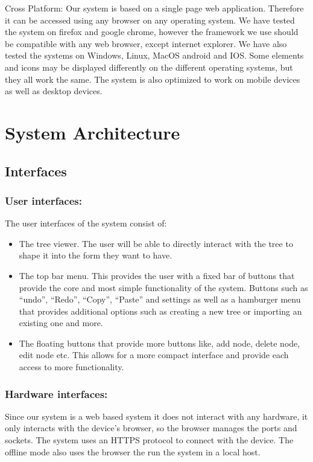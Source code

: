 \documentclass[12pt]{article}
\begin{document}
  Cross Platform:\newline 
  Our system is based on a single page web application. Therefore it can be accessed using any browser on any operating system. We have tested the system on firefox and google chrome, however the framework we use should be compatible with any web browser, except internet explorer. We have also tested the systems on Windows, Linux, MacOS android and IOS. Some elements and icons may be displayed differently on the different operating systems, but they all work the same. The system is also optimized to work on mobile devices as well as desktop devices.\newline\newline  


\section{System Architecture}
  \subsection{Interfaces} 
    \subsubsection{User interfaces:} 
      The user interfaces of the system consist of:
      \begin{itemize}
      \item The tree viewer. The user will be able to directly interact with the tree to shape it into the form they want to have.
      \item The top bar menu. This provides the user with a fixed bar of buttons that provide the core and most simple functionality of the system. Buttons such as “undo”, “Redo”, “Copy”, “Paste” and settings as well as a hamburger menu that provides additional options such as creating a new tree or importing an existing one and more.
      \item The floating buttons that provide more buttons like, add node, delete node, edit node etc. This allows for a more compact interface and provide each access to more functionality.
      \end{itemize}

    \subsubsection{Hardware interfaces:}
      Since our system is a web based system it does not interact with any hardware, it only interacts with the device’s browser, so the browser manages the ports and sockets. The system uses an HTTPS protocol to connect with the device. The offline mode also uses the browser the run the system in a local host.
\end{document}
